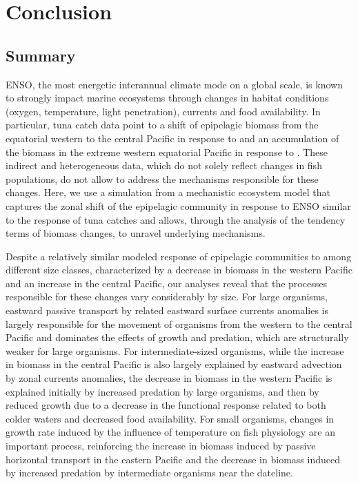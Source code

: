 
\section{Conclusion}
\label{sec:conclusion}


\subsection{Summary}

ENSO, the most energetic interannual climate mode on a  global scale, is known to strongly impact marine ecosystems through changes in habitat conditions (oxygen, temperature, light penetration), currents and food availability. In particular, tuna catch data point to a shift of epipelagic biomass from the equatorial western to the central Pacific in response to \nino{} and an accumulation of the biomass in the extreme western equatorial Pacific in response to \nina{}. These indirect and heterogeneous data, which do not solely reflect changes in fish populations, do not allow to address the mechanisms responsible for these changes. Here, we use a simulation from a mechanistic ecosystem model that captures the zonal shift of the epipelagic community in response to ENSO similar to the response of tuna catches and allows, through the analysis of the tendency terms of biomass changes, to unravel underlying mechanisms.

Despite a relatively similar modeled response of epipelagic communities to \nino{} among different size classes, characterized by a decrease in biomass in the western Pacific and an increase in the central Pacific, our analyses reveal that the processes responsible for these changes vary considerably by size. For large organisms,  eastward passive transport by \nino{} related eastward surface currents anomalies is largely responsible for the movement of organisms from the western to the central Pacific and dominates the effects of growth and predation, which are structurally weaker for large organisms. For intermediate-sized organisms, while the increase in biomass in the central Pacific is also largely explained by eastward advection by zonal currents anomalies, the decrease in biomass in the western Pacific is explained initially by increased predation by large organisms, and then by reduced growth due to a decrease in the functional response related to both colder waters and decreased food availability. For small organisms, changes in growth rate  induced by the influence of temperature on fish physiology are an important process, reinforcing the increase in biomass induced by passive horizontal transport in the eastern Pacific and the decrease in biomass induced by increased predation by intermediate organisms near the dateline.

